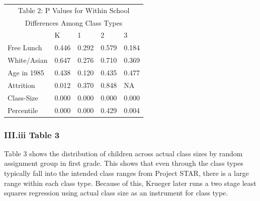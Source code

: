 \documentclass[a4paper,11pt]{article}
\begin{document}
\begin{table}[H]
\begin{center}	
\centering
	\begin{tabular}{ l | l  l  l  l } 
	\multicolumn{5}{c}{Table 2: P Values for Within School} \\
	\multicolumn{5}{c}{Differences Among Class Types} \\ \hline \hline
	& K  & 1  & 2  & 3  \\  \hline 
	Free Lunch & 0.446 & 0.292 & 0.579 & 0.184 \\  
	White/Asian & 0.647 & 0.276 & 0.710 & 0.369 \\  
	Age in 1985 & 0.438 & 0.120 & 0.435 & 0.477 \\  
	Attrition & 0.012 & 0.370 & 0.848 & NA \\  
	Class-Size & 0.000 & 0.000 & 0.000 & 0.000 \\  
	Percentile & 0.000 & 0.000 & 0.429 & 0.004 \\  
	\hline \hline
\end{tabular}
\end{center}
\end{table}


\subsubsection*{III.iii Table 3}	
Table 3 shows the distribution of children across actual class sizes by random assignment group in first grade. This shows that even through the class types typically fall into the intended class ranges from Project STAR, there is a large range within each class type. Because of this, Krueger later runs a two stage least squares regression using actual class size as an instrument for class type. 
\end{document}
